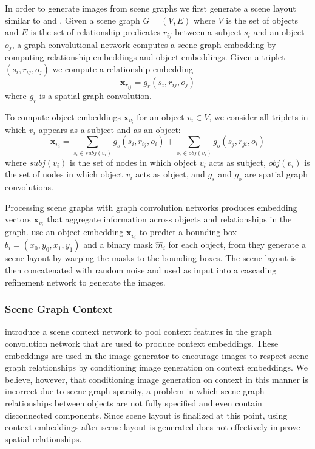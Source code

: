 \documentclass{article}
\newcommand{\vx}{\textbf{x}}
\begin{document}
In order to generate images from scene graphs we first generate a scene layout similar to \cite{sg2im} and \cite{sg2imgcontext}. Given a scene graph $G = (V, E)$ where $V$ is the set of objects and $E$ is the set of relationship predicates $r_{ij}$ between a subject $s_i$ and an object $o_j$, a graph convolutional network computes a scene graph embedding by computing relationship embeddings and object embeddings. Given a triplet $(s_i, r_{ij}, o_j)$ we compute a relationship embedding \[\vx_{r_{ij}} = g_r(s_i, r_{ij}, o_j)\]where $g_r$ is a spatial graph convolution.

To compute object embeddings $\vx_{v_i}$ for an object $v_i \in V$, we consider all triplets in which $v_i$ appears as a subject and as an object: \[\vx_{v_i} = \sum_{s_i \in subj(v_i)} g_s(s_i, r_{ij}, o_i) + \sum_{o_i \in obj(v_i)} g_o(s_j, r_{ji}, o_i) \]where $subj(v_i)$ is the set of nodes in which object $v_i$ acts as subject, $obj(v_i)$ is the set of nodes in which object $v_i$ acts as object, and $g_s$ and $g_o$ are spatial graph convolutions.

Processing scene graphs with graph convolution networks produces embedding vectors $\vx_{v_i}$ that aggregate information across objects and relationships in the graph. \cite{sg2im} use an object embedding $\vx_{v_i}$ to predict a bounding box $\hat{b}_i = (x_0, y_0, x_1, y_1)$ and a binary mask $\hat{m}_i$ for each object, from they generate a scene layout by warping the masks to the bounding boxes. The scene layout is then concatenated with random noise and used as input into a cascading refinement network to generate the images.

\subsubsection{Scene Graph Context}

\cite{sg2imgcontext} introduce a scene context network to pool context features in the graph convolution network that are used to produce context embeddings. These embeddings are used in the image generator to encourage images to respect scene graph relationships by conditioning image generation on context embeddings. We believe, however, that conditioning image generation on context in this manner is incorrect due to scene graph sparsity, a problem in which scene graph relationships between objects are not fully specified and even contain disconnected components. Since scene layout is finalized at this point, using context embeddings after scene layout is generated does not effectively improve spatial relationships.
\end{document}
